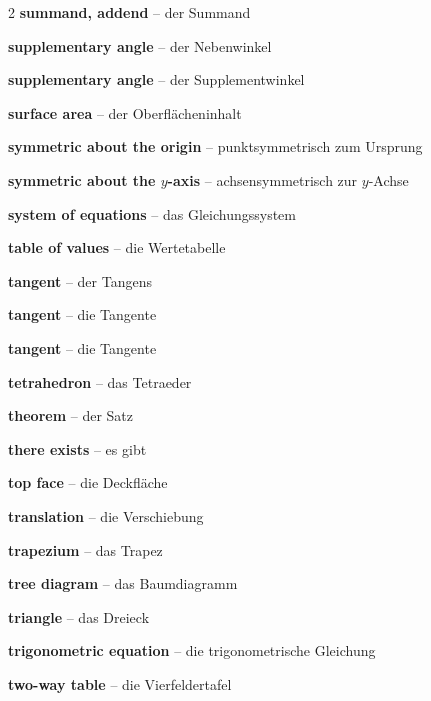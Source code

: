 \begin{multicols}{2}
\textbf{summand, addend} -- der Summand\dotfill\hyperref[e:16]{\pageref*{e:16}}\par
\textbf{supplementary angle} -- der Nebenwinkel\dotfill\hyperref[e:163]{\pageref*{e:163}}\par
\textbf{supplementary angle} -- der Supplementwinkel\dotfill\hyperref[e:165]{\pageref*{e:165}}\par
\textbf{surface area} -- der Oberflächeninhalt\dotfill\hyperref[e:256]{\pageref*{e:256}}\par
\textbf{symmetric about the origin} -- punktsymmetrisch zum Ursprung\dotfill\hyperref[e:145]{\pageref*{e:145}}\par
\textbf{symmetric about the $y$-axis} -- achsensymmetrisch zur $y$-Achse\dotfill\hyperref[e:144]{\pageref*{e:144}}\par
\textbf{system of equations} -- das Gleichungssystem\dotfill\hyperref[e:80]{\pageref*{e:80}}\par

\par\nopagebreak
\textbf{table of values} -- die Wertetabelle\dotfill\hyperref[e:112]{\pageref*{e:112}}\par
\textbf{tangent} -- der Tangens\dotfill\hyperref[e:134]{\pageref*{e:134}}\par
\textbf{tangent} -- die Tangente\dotfill\hyperref[e:224]{\pageref*{e:224}}\par
\textbf{tangent} -- die Tangente\dotfill\hyperref[e:279]{\pageref*{e:279}}\par
\textbf{tetrahedron} -- das Tetraeder\dotfill\hyperref[e:234]{\pageref*{e:234}}\par
\textbf{theorem} -- der Satz\dotfill\hyperref[e:347]{\pageref*{e:347}}\par
\textbf{there exists} -- es gibt\dotfill\hyperref[e:353]{\pageref*{e:353}}\par
\textbf{top face} -- die Deckfläche\dotfill\hyperref[e:249]{\pageref*{e:249}}\par
\textbf{translation} -- die Verschiebung\dotfill\hyperref[e:173]{\pageref*{e:173}}\par
\textbf{trapezium} -- das Trapez\dotfill\hyperref[e:202]{\pageref*{e:202}}\par
\textbf{tree diagram} -- das Baumdiagramm\dotfill\hyperref[e:332]{\pageref*{e:332}}\par
\textbf{triangle} -- das Dreieck\dotfill\hyperref[e:177]{\pageref*{e:177}}\par
\textbf{trigonometric equation} -- die trigonometrische Gleichung\dotfill\hyperref[e:86]{\pageref*{e:86}}\par
\textbf{two-way table} -- die Vierfeldertafel\dotfill\hyperref[e:333]{\pageref*{e:333}}\par


\end{multicols}
